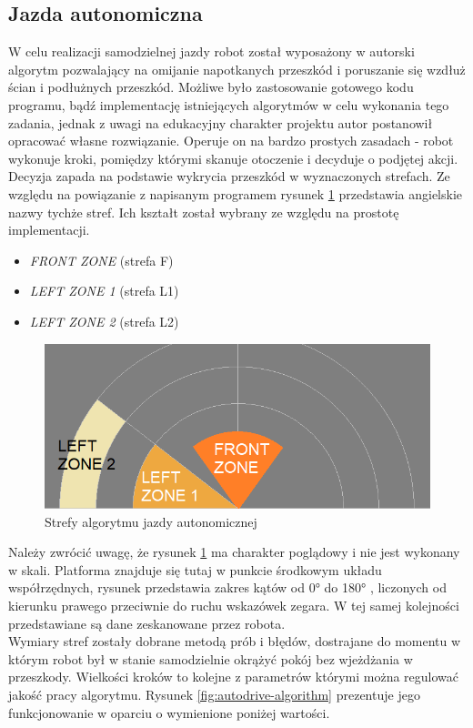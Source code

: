 \subsection{Jazda autonomiczna}
\label{sec:autonomous-drive}
W celu realizacji samodzielnej jazdy robot został wyposażony w autorski algorytm pozwalający na omijanie napotkanych przeszkód i poruszanie się wzdłuż ścian i podłużnych przeszkód. Możliwe było zastosowanie gotowego kodu programu, bądź implementację istniejących algorytmów w celu wykonania tego zadania, jednak z uwagi na edukacyjny charakter projektu autor postanowił opracować własne rozwiązanie. Operuje on na bardzo prostych zasadach - robot wykonuje kroki, pomiędzy którymi skanuje otoczenie i decyduje o podjętej akcji. Decyzja zapada na podstawie wykrycia przeszkód w wyznaczonych strefach. Ze względu na powiązanie z napisanym programem rysunek \ref{fig:autodrive-zones} przedstawia angielskie nazwy tychże stref. Ich kształt został wybrany ze względu na prostotę implementacji.
\begin{itemize}
    \item \emph{FRONT ZONE} (strefa F)
    \item \emph{LEFT ZONE 1} (strefa L1)
    \item \emph{LEFT ZONE 2} (strefa L2)
\end{itemize}

\begin{figure}[ht]
	\centering
		\includegraphics[width=1\linewidth]{rys/autodrive-zones.png}
	\caption{Strefy algorytmu jazdy autonomicznej}
	\label{fig:autodrive-zones}
\end{figure}

Należy zwrócić uwagę, że rysunek \ref{fig:autodrive-zones} ma charakter poglądowy i nie jest wykonany w skali. Platforma znajduje się tutaj w punkcie środkowym układu współrzędnych, rysunek przedstawia zakres kątów od 0° do 180° , liczonych od kierunku prawego przeciwnie do ruchu wskazówek zegara. W tej samej kolejności przedstawiane są dane zeskanowane przez robota.
\\
Wymiary stref zostały dobrane metodą prób i błędów, dostrajane do momentu w którym robot był w stanie samodzielnie okrążyć pokój bez wjeżdżania w przeszkody.
Wielkości kroków to kolejne z parametrów którymi można regulować jakość pracy algorytmu. Rysunek \ref{fig:autodrive-algorithm} prezentuje jego funkcjonowanie w oparciu o wymienione poniżej wartości.

